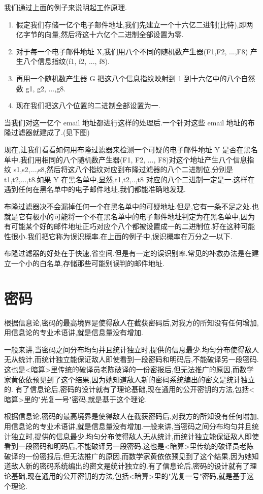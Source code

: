 \documentclass{article}
\begin{document}
我们通过上面的例子来说明起工作原理. 
\begin{enumerate}
\item 假定我们存储一亿个电子邮件地址,我们先建立一个十六亿二进制(比特),即两亿字节的向量,然后将这十六亿个二进制全部设置为零.
\item 对于每一个电子邮件地址 X,我们用八个不同的随机数产生器(F1,F2, ...,F8) 产生八个信息指纹(f1, f2, ..., f8).
\item 再用一个随机数产生器 G 把这八个信息指纹映射到 1 到十六亿中的八个自然数 g1, g2, ...,g8.
\item 现在我们把这八个位置的二进制全部设置为一.
\end{enumerate}

当我们对这一亿个 email 地址都进行这样的处理后.一个针对这些 email 地址的布隆过滤器就建成了.(见下图) 

现在,让我们看看如何用布隆过滤器来检测一个可疑的电子邮件地址 Y 是否在黑名单中.我们用相同的八个随机数产生器(F1, F2, ..., F8)对这个地址产生八个信息指纹 s1,s2,...,s8,然后将这八个指纹对应到布隆过滤器的八个二进制位,分别是 t1,t2,...,t8.如果 Y 在黑名单中,显然,t1,t2,..,t8 对应的八个二进制一定是一.这样在遇到任何在黑名单中的电子邮件地址,我们都能准确地发现. 

布隆过滤器决不会漏掉任何一个在黑名单中的可疑地址.但是,它有一条不足之处.也就是它有极小的可能将一个不在黑名单中的电子邮件地址判定为在黑名单中,因为有可能某个好的邮件地址正巧对应个八个都被设置成一的二进制位.好在这种可能性很小.我们把它称为误识概率.在上面的例子中,误识概率在万分之一以下. 

布隆过滤器的好处在于快速,省空间.但是有一定的误识别率.常见的补救办法是在建立一个小的白名单,存储那些可能别误判的邮件地址.

\section{密码}
根据信息论,密码的最高境界是使得敌人在截获密码后,对我方的所知没有任何增加,用信息论的专业术语讲,就是信息量没有增加.

一般来讲,当密码之间分布均匀并且统计独立时,提供的信息最少.均匀分布使得敌人无从统计,而统计独立能保证敌人即使看到一段密码和明码后,不能破译另一段密码.这也是<暗算>里传统的破译员老陈破译的一份密报后,但无法推广的原因,而数学家黄依依预见到了这个结果,因为她知道敌人新的密码系统编出的密文是统计独立的.
有了信息论后,密码的设计就有了理论基础,现在通用的公开密钥的方法,包括<暗算>里的"光复一号"密码,就是基于这个理论.

根据信息论,密码的最高境界是使得敌人在截获密码后,对我方的所知没有任何增加,用信息论的专业术语讲,就是信息量没有增加.一般来讲,当密码之间分布均匀并且统计独立时,提供的信息最少.均匀分布使得敌人无从统计,而统计独立能保证敌人即使看到一段密码和明码后,不能破译另一段密码.这也是<暗算>里传统的破译员老陈破译的一份密报后,但无法推广的原因,而数学家黄依依预见到了这个结果,因为她知道敌人新的密码系统编出的密文是统计独立的.有了信息论后,密码的设计就有了理论基础,现在通用的公开密钥的方法,包括<暗算>里的"光复一号"密码,就是基于这个理论.
\end{document}

